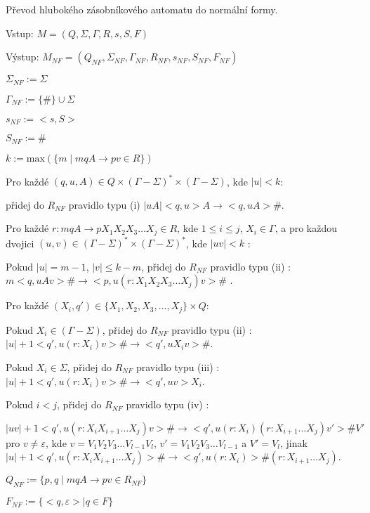 \begin{Alg}\label{alg_NF}
Převod hlubokého zásobníkového automatu do normální formy.

\begin{list}{}{\setlength\parsep{0cm} \setlength\itemsep{0cm} \setlength\leftmargin{1em}}
   \item Vstup: $M = (Q,\Sigma,\Gamma, R, s, S, F)$ 
   \item Výstup: $M_{NF} = (Q_{NF}, \Sigma_{NF}, {\Gamma}_{NF}, R_{NF}, s_{NF},  S_{NF}, F_{NF})$ \medskip
  
  \item ${\Sigma}_{NF} := \Sigma$
  \item ${\Gamma}_{NF} :=\{\#\} \cup \Sigma$
  \item $s_{NF} := <s,S>$
  \item $S_{NF} := \#$ \medskip

  \item $k := \mathrm{max}(\{m \mid mqA \rightarrow pv \in R\}) $ \medskip

  \item Pro každé $(q,u,A) \in Q \times (\Gamma - \Sigma)^* \times (\Gamma - \Sigma)$, kde $|u| < k$: \medskip

  \subitem přidej do $R_{NF}$ pravidlo typu (i) $|uA| <q,u> A \rightarrow <q,uA> \#$. \medskip

  \item Pro každé $r : mqA \rightarrow p X_1 X_2 X_3 \dots X_j \in R$, kde $1 \le i \le j$, $X_i \in \Gamma$, a 
         pro každou dvojici $(u,v) \in (\Gamma - \Sigma)^* \times (\Gamma - \Sigma)^*$, kde $|uv| < k$ : \medskip

  \subitem Pokud $|u| = m - 1$, $|v| \le k-m$, přidej do $R_{NF}$ pravidlo typu (ii) :
  \subitem $m <q,uAv> \# \rightarrow <p,u (r : X_1 X_2 X_3 \dots X_j) v>\#$ . \medskip

  \subitem Pro každé $(X_i,q') \in \{X_1, X_2, X_3, \dots, X_j\} \times Q$: \medskip

  \subsubitem Pokud $X_i \in (\Gamma - \Sigma)$, přidej do $R_{NF}$ pravidlo typu (ii) :
  \subsubitem $|u|+1 <q',u (r : X_i) v> \# \rightarrow <q',u X_i v> \# $. \medskip

  \subsubitem Pokud $X_i \in \Sigma$, přidej do $R_{NF}$ pravidlo typu (iii) :
  \subsubitem $|u|+1 <q',u (r : X_i) v> \# \rightarrow <q',uv> X_i $.\medskip

  \subsubitem Pokud $i < j$, přidej do $R_{NF}$ pravidlo typu (iv) :

  \subsubitem $|uv|+1 <q',u(r : X_i X_{i+1} \dots X_j)v> \# \rightarrow <q',u(r : X_i) (r: X_{i+1} \dots X_j)v'>\# V' $
  \subsubitem pro $v \ne \varepsilon$, kde $v = V_1 V_2 V_3 \dots V_{l-1} V_l$, $v' = V_1 V_2 V_3 \dots V_{l-1}$ a $V'=V_l$, jinak
  \subsubitem $|u|+1 <q',u(r : X_i X_{i+1} \dots X_j)> \# \rightarrow <q',u(r : X_i)>\# (r: X_{i+1} \dots X_j)$.\bigskip

  \item $Q_{NF} := \{p,q \mid mqA \rightarrow pv \in R_{NF}\} $
  \item $F_{NF} := \{<q, \varepsilon> \mid  q \in F \}$


\end{list}
\end{Alg}

